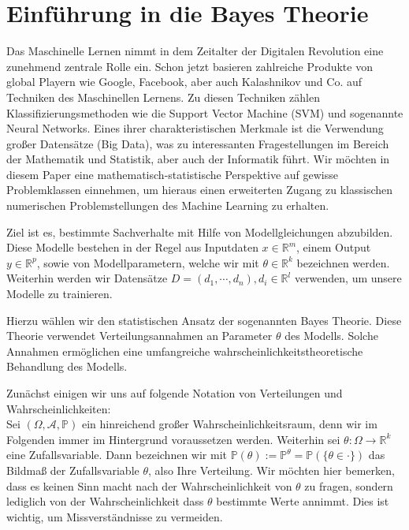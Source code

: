 \thispagestyle{plain}
\section{Einführung in die Bayes Theorie}

Das Maschinelle Lernen nimmt in dem Zeitalter der Digitalen Revolution eine zunehmend zentrale Rolle ein. Schon jetzt basieren zahlreiche Produkte von global Playern wie Google, Facebook, aber auch Kalashnikov und Co. auf Techniken des Maschinellen Lernens. Zu diesen Techniken zählen Klassifizierungsmethoden wie die Support Vector Machine (SVM) und sogenannte Neural Networks. Eines ihrer charakteristischen Merkmale ist die Verwendung großer Datensätze (Big Data), was zu interessanten Fragestellungen im Bereich der Mathematik und Statistik, aber auch der Informatik führt. Wir möchten in diesem Paper eine mathematisch-statistische Perspektive auf gewisse Problemklassen einnehmen, um hieraus einen erweiterten Zugang zu klassischen numerischen Problemstellungen des Machine Learning zu erhalten.


Ziel ist es, bestimmte Sachverhalte mit Hilfe von Modellgleichungen abzubilden. Diese Modelle bestehen in der Regel aus Inputdaten $x \in \mathbb{R}^m$, einem Output $y \in \mathbb{R}^p$, sowie von Modellparametern, welche wir mit $\theta \in \mathbb{R}^k$ bezeichnen werden. Weiterhin werden wir Datensätze $D = (d_1, \cdots, d_n), d_i \in \mathbb{R}^l$ verwenden, um unsere Modelle zu trainieren. 


Hierzu wählen wir den statistischen Ansatz der sogenannten Bayes Theorie. Diese Theorie verwendet Verteilungsannahmen an Parameter $\theta$ des Modells. Solche Annahmen ermöglichen eine umfangreiche wahrscheinlichkeitstheoretische Behandlung des Modells.

Zunächst einigen wir uns auf folgende Notation von Verteilungen und Wahrscheinlichkeiten: \\
Sei $(\Omega, \mathcal{A}, \mathbb{P})$ ein hinreichend großer Wahrscheinlichkeitsraum, denn wir im Folgenden immer im Hintergrund voraussetzen werden. Weiterhin sei $\theta: \Omega \rightarrow \mathbb{R}^k$ eine Zufallsvariable. Dann bezeichnen wir mit
$\mathbb{P}(\theta) := \mathbb{P}^\theta = \mathbb{P}(\{ \theta \in \cdot \})$
das Bildmaß der Zufallsvariable $\theta$, also Ihre Verteilung.
Wir möchten hier bemerken, dass es keinen Sinn macht nach der Wahrscheinlichkeit von $\theta$ zu fragen, sondern lediglich von der Wahrscheinlichkeit dass $\theta$ bestimmte Werte annimmt. Dies ist wichtig, um Missverständnisse zu vermeiden.

